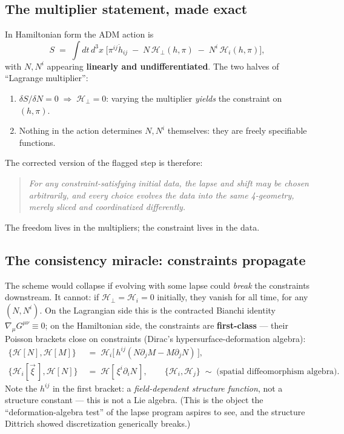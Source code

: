 \documentclass[11pt]{article}
\newcommand{\Hh}{\mathcal{H}}
\begin{document}
\subsection{The multiplier statement, made exact}

In Hamiltonian form the ADM action is
\[
S \;=\; \int dt\, d^3x \;\Big[\pi^{ij}\dot h_{ij}
\;-\; N\,\Hh_\perp(h,\pi) \;-\; N^i\,\Hh_i(h,\pi)\Big],
\]
with $N, N^i$ appearing \textbf{linearly and undifferentiated}. The two halves of
``Lagrange multiplier'':
\begin{enumerate}
\item $\delta S/\delta N = 0 \;\Rightarrow\; \Hh_\perp = 0$: varying the multiplier
\emph{yields} the constraint on $(h,\pi)$.
\item Nothing in the action determines $N, N^i$ themselves: they are freely specifiable
functions.
\end{enumerate}
The corrected version of the flagged step is therefore:
\begin{quote}
\emph{For any constraint-satisfying initial data, the lapse and shift may be chosen
arbitrarily, and every choice evolves the data into the same 4-geometry, merely sliced
and coordinatized differently.}
\end{quote}
The freedom lives in the multipliers; the constraint lives in the data.

\subsection{The consistency miracle: constraints propagate}

The scheme would collapse if evolving with some lapse could \emph{break} the constraints
downstream. It cannot: if $\Hh_\perp = \Hh_i = 0$ initially, they vanish for all time,
for any $(N,N^i)$. On the Lagrangian side this is the contracted Bianchi identity
$\nabla_\mu G^{\mu\nu} \equiv 0$; on the Hamiltonian side, the constraints are
\textbf{first-class} --- their Poisson brackets close on constraints (Dirac's
hypersurface-deformation algebra):
\begin{align}
\{\Hh[N], \Hh[M]\} &\;=\; \Hh_i\big[\,h^{ij}(N\partial_j M - M\partial_j N)\,\big],\\
\{\Hh_i[\vec\xi\,], \Hh[N]\} &\;=\; \Hh[\,\xi^i\partial_i N\,],\qquad
\{\Hh_i, \Hh_j\} \;\sim\; \text{(spatial diffeomorphism algebra)} .
\end{align}
Note the $h^{ij}$ in the first bracket: a \emph{field-dependent structure function}, not
a structure constant --- this is not a Lie algebra. (This is the object the
``deformation-algebra test'' of the lapse program aspires to see, and the structure
Dittrich showed discretization generically breaks.)
\end{document}
